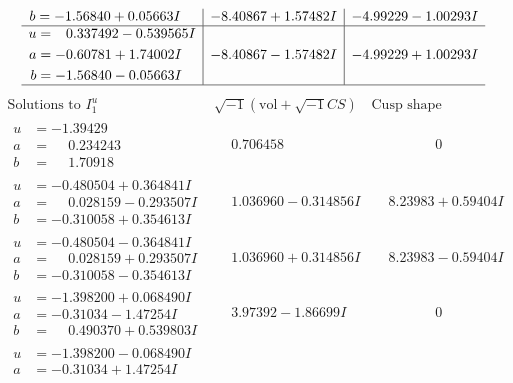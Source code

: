 \documentclass[1p]{elsarticle_modified}
\theoremstyle{definition}
\newcommand{\I}{\sqrt{-1}}
\begin{document}
$$\begin{array}{c|c|c}
\begin{aligned}
b &= -1.56840 + 0.05663 I\end{aligned}
 & -8.40867 + 1.57482 I & -4.99229 - 1.00293 I \\ \hline\begin{aligned}
u &= \phantom{-}0.337492 - 0.539565 I \\
a &= -0.60781 + 1.74002 I \\
b &= -1.56840 - 0.05663 I\end{aligned}
 & -8.40867 - 1.57482 I & -4.99229 + 1.00293 I\\
 \hline 
 \end{array}$$\newpage$$\begin{array}{c|c|c}  
\text{Solutions to }I^u_{1}& \I (\text{vol} + \sqrt{-1}CS) & \text{Cusp shape}\\
 \hline 
\begin{aligned}
u &= -1.39429\phantom{ +0.000000I} \\
a &= \phantom{-}0.234243\phantom{ +0.000000I} \\
b &= \phantom{-}1.70918\phantom{ +0.000000I}\end{aligned}
 & \phantom{-}0.706458\phantom{ +0.000000I} & \phantom{-0.000000 } 0 \\ \hline\begin{aligned}
u &= -0.480504 + 0.364841 I \\
a &= \phantom{-}0.028159 - 0.293507 I \\
b &= -0.310058 + 0.354613 I\end{aligned}
 & \phantom{-}1.036960 - 0.314856 I & \phantom{-}8.23983 + 0.59404 I \\ \hline\begin{aligned}
u &= -0.480504 - 0.364841 I \\
a &= \phantom{-}0.028159 + 0.293507 I \\
b &= -0.310058 - 0.354613 I\end{aligned}
 & \phantom{-}1.036960 + 0.314856 I & \phantom{-}8.23983 - 0.59404 I \\ \hline\begin{aligned}
u &= -1.398200 + 0.068490 I \\
a &= -0.31034 - 1.47254 I \\
b &= \phantom{-}0.490370 + 0.539803 I\end{aligned}
 & \phantom{-}3.97392 - 1.86699 I & \phantom{-0.000000 } 0 \\ \hline\begin{aligned}
u &= -1.398200 - 0.068490 I \\
a &= -0.31034 + 1.47254 I \\

\end{aligned}
\end{array}$$
\end{document}
